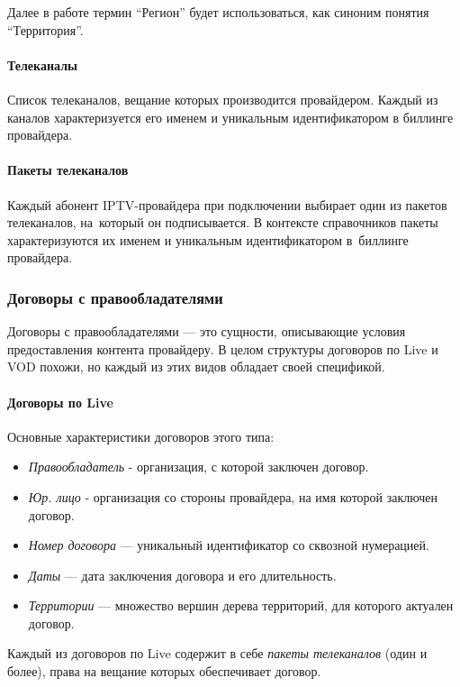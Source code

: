 Далее в работе термин ``Регион'' будет использоваться, как синоним понятия ``Территория''.

\paragraph{Телеканалы}
Список телеканалов, вещание которых производится провайдером. Каждый из каналов характеризуется его именем
и уникальным идентификатором в биллинге провайдера.

\paragraph{Пакеты телеканалов}
Каждый абонент IPTV-провайдера при подключении выбирает один из пакетов телеканалов, на~который
он подписывается. В контексте справочников пакеты характеризуются их именем и уникальным идентификатором
в~биллинге провайдера.

\subsubsection{Договоры с правообладателями}

Договоры с правообладателями --- это сущности, описывающие условия предоставления контента провайдеру.
В целом структуры договоров по Live и VOD похожи, но каждый из этих видов обладает своей спецификой.

\paragraph{Договоры по Live}
Основные характеристики договоров этого типа:

\begin{itemize}
\item{
  \textit{Правообладатель} - организация, с которой заключен договор.
}
\item{
  \textit{Юр. лицо} -  организация со стороны провайдера, на имя которой заключен договор.
}
\item{
  \textit{Номер договора} ---  уникальный идентификатор со сквозной нумерацией.
}
\item{
  \textit{Даты} --- дата заключения договора и его длительность.
}
\item{
  \textit{Территории} --- множество вершин дерева территорий, для которого актуален договор.
}
\end{itemize}

Каждый из договоров по Live содержит в себе \textit{пакеты телеканалов} (один и более), права на вещание которых обеспечивает договор.


